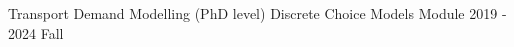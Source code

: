 

\vspace{-1.ex}
\begin{cvteachings}
  \cvteaching
	{Transport Demand Modelling (PhD level)} %
	{Discrete Choice Models Module} %
	{} %
	{2019 - 2024 Fall } %
\end{cvteachings}

